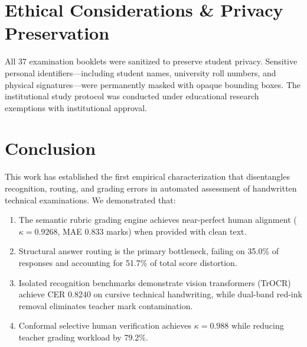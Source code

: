 \documentclass[journal]{IEEEtran}
\begin{document}
\section{Ethical Considerations \& Privacy Preservation}
All 37 examination booklets were sanitized to preserve student privacy. Sensitive personal identifiers---including student names, university roll numbers, and physical signatures---were permanently masked with opaque bounding boxes. The institutional study protocol was conducted under educational research exemptions with institutional approval.

\section{Conclusion}
This work has established the first empirical characterization that disentangles recognition, routing, and grading errors in automated assessment of handwritten technical examinations. We demonstrated that:
\begin{enumerate}
    \item The semantic rubric grading engine achieves near-perfect human alignment ($\kappa = 0.9268$, MAE 0.833 marks) when provided with clean text.
    \item Structural answer routing is the primary bottleneck, failing on 35.0\% of responses and accounting for 51.7\% of total score distortion.
    \item Isolated recognition benchmarks demonstrate vision transformers (TrOCR) achieve CER 0.8240 on cursive technical handwriting, while dual-band red-ink removal eliminates teacher mark contamination.
    \item Conformal selective human verification achieves $\kappa = 0.988$ while reducing teacher grading workload by 79.2\%.
\end{enumerate}



\end{document}
